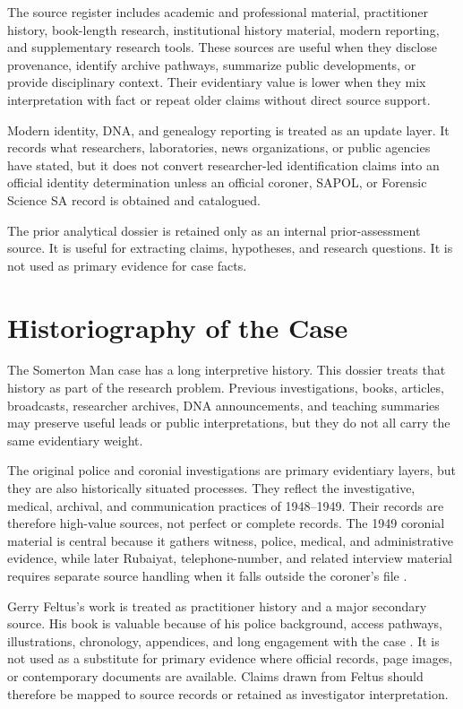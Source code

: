 The source register includes academic and professional material, practitioner history, book-length research, institutional history material, modern reporting, and supplementary research tools. These sources are useful when they disclose provenance, identify archive pathways, summarize public developments, or provide disciplinary context. Their evidentiary value is lower when they mix interpretation with fact or repeat older claims without direct source support.

Modern identity, DNA, and genealogy reporting is treated as an update layer. It records what researchers, laboratories, news organizations, or public agencies have stated, but it does not convert researcher-led identification claims into an official identity determination unless an official coroner, SAPOL, or Forensic Science SA record is obtained and catalogued.

The prior analytical dossier is retained only as an internal prior-assessment source. It is useful for extracting claims, hypotheses, and research questions. It is not used as primary evidence for case facts.

\section{Historiography of the Case}

The Somerton Man case has a long interpretive history. This dossier treats that history as part of the research problem. Previous investigations, books, articles, broadcasts, researcher archives, DNA announcements, and teaching summaries may preserve useful leads or public interpretations, but they do not all carry the same evidentiary weight.

The original police and coronial investigations are primary evidentiary layers, but they are also historically situated processes. They reflect the investigative, medical, archival, and communication practices of 1948--1949. Their records are therefore high-value sources, not perfect or complete records. The 1949 coronial material is central because it gathers witness, police, medical, and administrative evidence, while later Rubaiyat, telephone-number, and related interview material requires separate source handling when it falls outside the coroner's file \parencite{src-src-0001,doc-doc-0001,src-src-0003}.

Gerry Feltus's work is treated as practitioner history and a major secondary source. His book is valuable because of his police background, access pathways, illustrations, chronology, appendices, and long engagement with the case \parencite{src-src-0018}. It is not used as a substitute for primary evidence where official records, page images, or contemporary documents are available. Claims drawn from Feltus should therefore be mapped to source records or retained as investigator interpretation.

